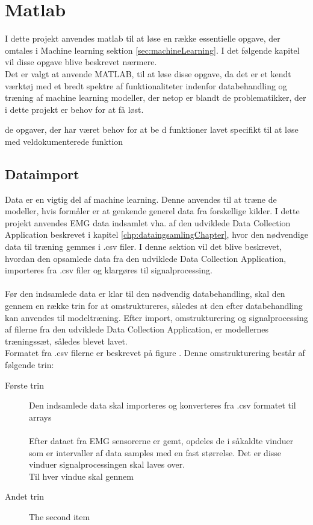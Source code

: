 \thispagestyle{fancy}
\chapter{Matlab}
\label{chp:matlabChapter}

I dette projekt anvendes matlab til at løse en række essentielle opgave, der omtales i Machine learning sektion \ref{sec:machineLearning}. I det følgende kapitel vil disse opgave blive beskrevet nærmere. \\
Det er valgt at anvende MATLAB, til at løse disse opgave, da det er et kendt værktøj med et bredt spektre af funktionaliteter indenfor databehandling og træning af machine learning modeller, der netop er blandt de problematikker, der i dette projekt er behov for at få løst. 
  
de opgaver, der har været behov for at be d
 funktioner lavet specifikt til at løse 
med veldokumenterede funktion

\section{Dataimport}
Data er en vigtig del af machine learning. Denne anvendes til at træne de modeller, hvis formåler er at genkende generel data fra forskellige kilder. I dette projekt anvendes EMG data indsamlet vha. af den udviklede Data Collection Application beskrevet i kapitel \ref{chp:dataingsamlingChapter}, hvor den nødvendige data til træning gemmes i .csv filer. I denne sektion vil det blive beskrevet, hvordan den opsamlede data fra den udviklede Data Collection Application, importeres fra .csv filer og klargøres til signalprocessing.
\\\\
Før den indsamlede data er klar til den nødvendig databehandling, skal den gennem en række trin for at omstruktureres, således at den efter databehandling kan anvendes til modeltræning. Efter import, omstrukturering og signalprocessing af filerne fra den udviklede Data Collection Application, er modellernes træningssæt, således blevet lavet. 
\\
Formatet fra .csv filerne er beskrevet på figure . 
Denne omstrukturering består af følgende trin:
\begin{description}
	\item[Første trin] Den indsamlede data skal importeres og konverteres fra .csv formatet til arrays\\\\
	Efter dataet fra EMG sensorerne er gemt, opdeles de i såkaldte vinduer som er intervaller af data samples med en fast størrelse. Det er disse vinduer signalprocessingen skal laves over.
	\\
	Til hver vindue skal gennem 
	

  
  \item[Andet trin] The second item
\end{description}



